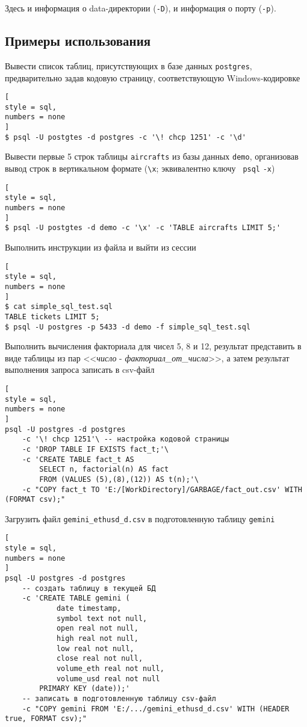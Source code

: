 \documentclass[%
	11pt,
	a4paper,
	utf8,
		]{article}
\begin{document}
Здесь и информация о data-директории (\verb|-D|), и информация о порту (\verb|-p|). 



\subsection{Примеры использования}

Вывести список таблиц, присутствующих в базе данных \texttt{postgres}, предварительно задав кодовую страницу, соответствующую Windows-кодировке
\begin{lstlisting}[
style = sql,
numbers = none
]
$ psql -U postgtes -d postgres -c '\! chcp 1251' -c '\d'
\end{lstlisting}

Вывести первые 5 строк таблицы \texttt{aircrafts} из базы данных \texttt{demo}, организовав вывод строк в вертикальном формате (\verb|\x|; эквивалентно ключу \texttt{ psql} \verb|-x|)
\begin{lstlisting}[
style = sql,
numbers = none
]
$ psql -U postgtes -d demo -c '\x' -c 'TABLE aircrafts LIMIT 5;'
\end{lstlisting}

Выполнить инструкции из файла и выйти из сессии
\begin{lstlisting}[
style = sql,
numbers = none	
]
$ cat simple_sql_test.sql
TABLE tickets LIMIT 5;
$ psql -U postgres -p 5433 -d demo -f simple_sql_test.sql
\end{lstlisting}

Выполнить вычисления факториала для чисел 5, 8 и 12, результат представить в виде таблицы из пар <<\emph{число} - \emph{факториал\_от\_числа}>>, а затем результат выполнения запроса записать в csv-файл
\begin{lstlisting}[
style = sql,
numbers = none
]
psql -U postgres -d postgres
    -c '\! chcp 1251'\ -- настройка кодовой страницы
    -c 'DROP TABLE IF EXISTS fact_t;'\
    -c 'CREATE TABLE fact_t AS
        SELECT n, factorial(n) AS fact
        FROM (VALUES (5),(8),(12)) AS t(n);'\
    -c "COPY fact_t TO 'E:/[WorkDirectory]/GARBAGE/fact_out.csv' WITH (FORMAT csv);"
\end{lstlisting}

Загрузить файл \texttt{gemini\_ethusd\_d.csv} в подготовленную таблицу \texttt{gemini}
\begin{lstlisting}[
style = sql,
numbers = none
]
psql -U postgres -d postgres
    -- создать таблицу в текущей БД
    -c 'CREATE TABLE gemini ( 
            date timestamp,
            symbol text not null,
            open real not null,
            high real not null,
            low real not null,
            close real not null,
            volume_eth real not null,
            volume_usd real not null
        PRIMARY KEY (date));'
    -- записать в подготовленную таблицу csv-файл
    -c "COPY gemini FROM 'E:/.../gemini_ethusd_d.csv' WITH (HEADER true, FORMAT csv);"
\end{lstlisting}
\end{document}
